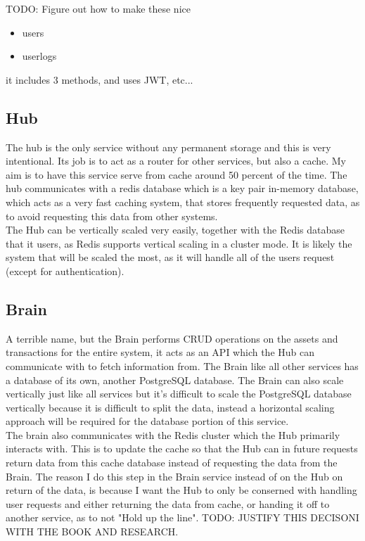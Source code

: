 \documentclass[titlepage]{article}
\begin{document}
TODO: Figure out how to make these nice
\begin{itemize}
  \item users
  \item userlogs
\end{itemize}

it includes 3 methods, and uses JWT, etc...

\subsection{Hub}
The hub is the only service without any permanent storage and this is very intentional. Its job is to act as a router for other services, but also a cache. My aim is to have this service serve from cache around 50 percent of the time. The hub communicates with a redis database which is a key pair in-memory database, which acts as a very fast caching system, that stores frequently requested data, as to avoid requesting this data from other systems. \\

The Hub can be vertically scaled very easily, together with the Redis database that it users, as Redis supports vertical scaling in a cluster mode. It is likely the system that will be scaled the most, as it will handle all of the users request (except for authentication).

\subsection{Brain}
A terrible name, but the Brain performs CRUD operations on the assets and transactions for the entire system, it acts as an API which the Hub can communicate with to fetch information from. The Brain like all other services has a database of its own, another PostgreSQL database. The Brain can also scale vertically just like all services but it's difficult to scale the PostgreSQL database vertically because it is difficult to split the data, instead a horizontal scaling approach will be required for the database portion of this service. \\

The brain also communicates with the Redis cluster which the Hub primarily interacts with. This is to update the cache so that the Hub can in future requests return data from this cache database instead of requesting the data from the Brain. The reason I do this step in the Brain service instead of on the Hub on return of the data, is because I want the Hub to only be conserned with handling user requests and either returning the data from cache, or handing it off to another service, as to not "Hold up the line". TODO: JUSTIFY THIS DECISONI WITH THE BOOK AND RESEARCH.
\end{document}
